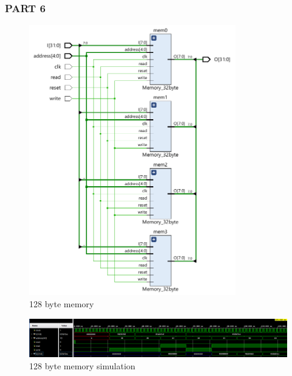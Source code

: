\documentclass[pdftex,12pt,a4paper]{article}
\begin{document}
\subsubsection{PART 6}
\begin{figure}[H]
    	\centering
    	\includegraphics[width=0.8\textwidth]{schematic/part6_design.png}	
    	\caption{128 byte memory}
    	\label{128 byte memory}
    \end{figure}
    
    \begin{figure}[H]
    	\centering
    	\includegraphics[width=1\textwidth]{simulations/part6_result.png}	
    	\caption{128 byte memory simulation}
    	\label{128 byte memory simulation}
    \end{figure}




\pagebreak
\end{document}

